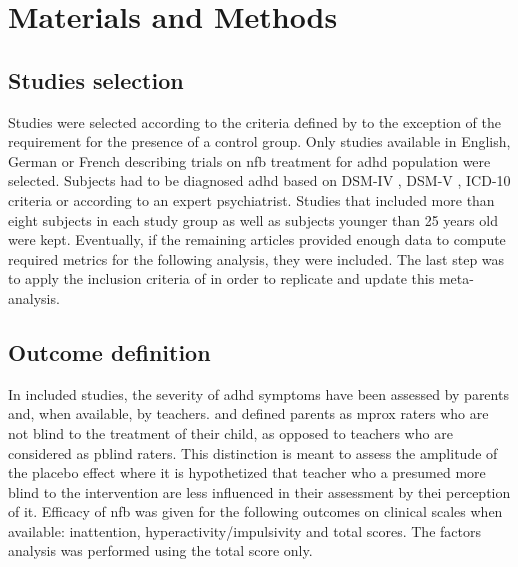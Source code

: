 

\section{Materials and Methods}

\subsection{Studies selection}

Studies were selected according to the criteria defined by \citet{Cortese2016} to the exception of the requirement for the presence of a control group. 
Only studies available in English, German or French describing trials on \gls{nfb} treatment for \gls{adhd} 
population were selected. Subjects had to be diagnosed \gls{adhd} based on DSM-IV \citep{DSM-4}, DSM-V \citep{DSM-5}, ICD-10 \citep{ICD101993} criteria or according to an expert psychiatrist. Studies that included more than eight subjects in each study group as well as subjects younger than 25 years old were kept. Eventually, if the remaining articles provided enough data to compute required metrics for the following analysis, they were included. The last step was to apply the inclusion criteria of \citet{Cortese2016} in order to replicate and update this meta-analysis.  

\subsection{Outcome definition} 

In included studies, the severity of \gls{adhd} symptoms have been assessed by parents and, when available, by teachers. \citet{Cortese2016} 
and \citet{Micoulaud2014} defined parents as \gls{mprox} raters who are not blind to the treatment of their child, as opposed to 
teachers who are considered as \gls{pblind} raters. This distinction is meant to assess the amplitude of the placebo effect where it is hypothetized that teacher who a presumed more blind to the intervention are less influenced in their assessment by thei perception of it. Efficacy of \gls{nfb} was given for the following outcomes on clinical scales when available: inattention, 
hyperactivity/impulsivity and total scores. The factors analysis was performed using the total score only.

